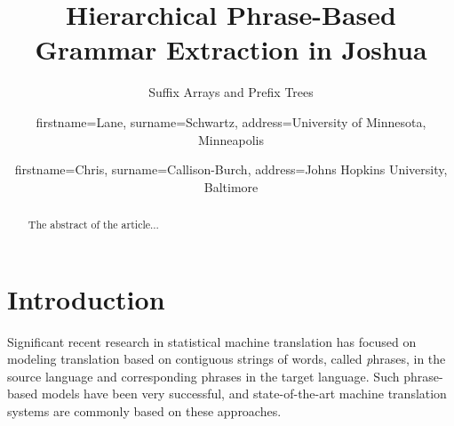 \documentclass{pbml}
\begin{document}
% 

\title{Hierarchical Phrase-Based Grammar Extraction in Joshua}


\subtitle{Suffix Arrays and Prefix Trees}


\author{firstname=Lane, surname=Schwartz,
       address={University of Minnesota, Minneapolis}}

\author{firstname=Chris, surname=Callison-Burch,
       address={Johns Hopkins University, Baltimore}}

% 



\maketitle


% 

\begin{abstract}
The abstract of the article...
\end{abstract}



\section{Introduction}

Significant recent research in statistical machine translation has focused on modeling translation based on contiguous strings of words, called {\textit phrases}, in the source language and corresponding phrases in the target language. Such phrase-based models \cite{Koehn2003,Marcu2002,Och2004,Och1999} have been very successful, and state-of-the-art machine translation systems are commonly based on these approaches.
\end{document}
